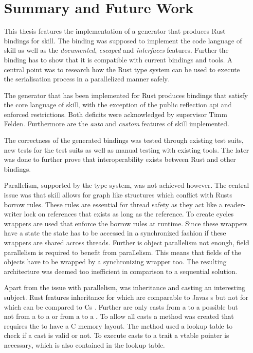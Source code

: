 \documentclass[thesis]{subfiles}
\begin{document}
\chapter{Summary and Future Work}
This thesis features the implementation of a generator that produces Rust bindings for \gls{skill}.
The binding was supposed to implement the code language of \gls{skill} as well as the \emph{documented}, \emph{escaped} and \emph{interfaces} features.
Further the binding has to show that it is compatible with current bindings and tools.
A central point was to research how the Rust type system can be used to execute the serialisation process in a parallelized manner safely.

The generator that has been implemented for Rust produces bindings that satisfy the core language of \gls{skill}, with the exception of the public reflection \gls{api} and  enforced restrictions.
Both deficits were acknowledged by supervisor Timm Felden.
Furthermore are the \emph{auto} and \emph{custom} features of \gls{skill} implemented.

The correctness of the generated bindings was tested through existing test suits, new tests for the test suits as well as manual testing with existing tools.
The later was done to further prove that interoperability exists between Rust and other bindings.

Parallelism, supported by the type system, was not achieved however.
The central issue was that \gls{skill} allows for graph like structures which conflict with Rusts borrow rules.
These rules are essential for thread safety as they act like a reader-writer lock on references that exists as long as the reference.
To create cycles wrappers are used that enforce the borrow rules at runtime.
Since these wrappers have a state the state has to be accessed in a synchronized fashion if these wrappers are shared across threads.
Further is object parallelism not enough, field parallelism is required to benefit from parallelism.
This means that fields of the objects have to be wrapped by a synchronizing wrapper too.
The resulting architecture was deemed too inefficient in comparison to a sequential solution.

Apart from the issue with parallelism, was inheritance and casting an interesting subject.
Rust features inheritance for \traits which are comparable to Javas s but not for \structs which can be compared to Cs \structs.
Further are only casts from a \struct to a \trait possible but not from a \trait to a \struct or from a \trait to a \trait.
To allow all casts a method was created that requires the \structs to have a C memory layout.
The method used a lookup table to check if a cast is valid or not.
To execute casts to a trait a vtable pointer is necessary, which is also contained in the lookup table.
\end{document}
